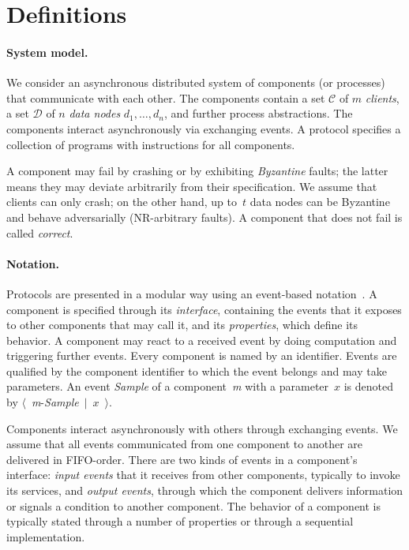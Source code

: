 \documentclass[oribibl]{llncs}
\theoremstyle{definition-boldhead}
\newcommand{\var}[1]{\textit{#1}}
\newcommand{\op}[1]{\textsl{#1}}
\newcommand{\eventt}[3]{$\langle$~{\var{#1}}-\textsl{#2}~$\mid$~{#3}~$\rangle$}
\newcommand{\replicaset}{\ensuremath{\mathcal{D}}\xspace}
\newcommand{\clientset}{\ensuremath{\mathcal{C}}\xspace}
\newcommand{\nodes}{nodes\xspace}
\begin{document}
\section{Definitions}
\label{sec:def}

\paragraph{System model.}
We consider an asynchronous distributed system of components (or
processes) that communicate with each other.  The components contain a
set \clientset of $m$ \emph{clients}, a set $\replicaset$ of $n$
\emph{data \nodes} $d_1, \dots, d_n$, and further process
abstractions.  The components interact asynchronously via exchanging
events.  A protocol specifies a collection of programs with
instructions for all components.


A component may fail by crashing or by exhibiting \emph{Byzantine}
faults; the latter means they may deviate arbitrarily from their
specification.  We assume that clients can only crash;
on the other hand, up to~$t$ data \nodes can
be Byzantine and behave adversarially (NR-arbitrary faults).  A
component that does not fail is called \emph{correct}.





\paragraph{Notation.}
Protocols are presented in a modular way using an event-based
notation~\cite{CachinGR11}.  A component is specified through its
\emph{interface}, containing the events that it exposes to other
components that may call it, and its \emph{properties}, which define
its behavior.  A component may react to a received event by doing
computation and triggering further events.
Every component is named by an identifier.  Events are qualified by
the component identifier to which the event belongs and may take
parameters.  An event \op{Sample} of a component~\var{m} with a
parameter~$x$ is denoted by \eventt{m}{Sample}{$x$}.

\if\submit\no
Components interact asynchronously with others through exchanging
events.  We assume that all events communicated from one component to
another are delivered in FIFO-order.
There are two kinds of events in a component's interface: \emph{input
  events} that it receives from other components, typically to invoke
its services, and \emph{output events}, through which the component
delivers information or signals a condition to another component.  The
behavior of a component is typically stated through a number of
properties or through a sequential implementation.
\fi
\end{document}
